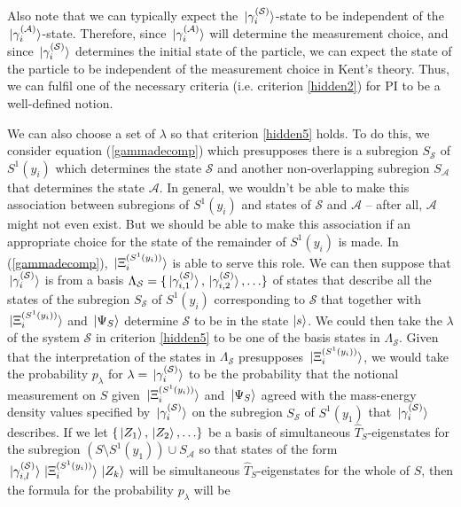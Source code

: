Also note that we can typically expect the $\ket*{\gamma_i^{(\mathcal{S})}}$-state to be independent of the $\ket*{\gamma_i^{(\mathcal{A})}}$-state. Therefore, since $\ket*{\gamma_i^{(\mathcal{A})}}$ will determine the measurement choice, and since $\ket*{\gamma_i^{(\mathcal{S})}}$ determines the initial state of the particle, we can expect the state of the particle to be independent of the measurement choice in Kent's theory. Thus, we can fulfil one of the necessary criteria (i.e. criterion \ref{hidden2}) for PI to be a well-defined notion.

We can also choose a set of $\lambda$ so that criterion \ref{hidden5} holds. To do this, we consider equation (\ref{gammadecomp}) which presupposes there is a subregion $S_{\mathcal{S}}$ of $S^1(y_i)$ which determines the state $\mathcal{S}$ and another non-overlapping subregion $S_{\mathcal{A}}$ that determines the state $\mathcal{A}$. In general, we wouldn't be able to make this association between subregions of $S^1(y_i)$ and states of  $\mathcal{S}$  and $\mathcal{A}$ -- after all, $\mathcal{A}$ might not even exist. But we should be able to make this association if an appropriate choice for the state of the remainder of $S^1(y_i)$ is made. In (\ref{gammadecomp}), $\ket*{\Xi_i^{(S^1(y_i))}}$ is able to serve this role. We can then suppose that $\ket*{\gamma_i^{(\mathcal{S})}}$ is from a basis $\Lambda_{\mathcal{S}}=\{\ket*{\gamma_{i,1}^{(\mathcal{S})}},\ket*{\gamma_{i,2}^{(\mathcal{S})}},\ldots\}$ of states that describe all the states of the subregion $S_{\mathcal{S}}$ of $S^1(y_i)$ corresponding to $\mathcal{S}$ that together with $\ket*{\Xi_i^{(S^1(y_i))}}$ and $\ket*{\Psi_S}$ determine $\mathcal{S}$ to be in the state $\ket{s}$. We could then take the $\lambda$ of the system $\mathcal{S}$ in criterion \ref{hidden5} to be one of the basis states in $\Lambda_{\mathcal{S}}$. Given that the interpretation of the states in $\Lambda_{\mathcal{S}}$ presupposes $\ket*{\Xi_i^{(S^1(y_i))}}$, we would take the probability $p_\lambda$ for $\lambda = \ket*{\gamma_i^{(\mathcal{S})}}$ to be the probability that the notional measurement on $S$ given $\ket*{\Xi_i^{(S^1(y_i))}}$ and $\ket*{\Psi_S}$ agreed with the mass-energy density values specified by $ \ket*{\gamma_i^{(\mathcal{S})}}$ on the subregion $S_{\mathcal{S}}$ of $S^1(y_1)$ that $ \ket*{\gamma_i^{(\mathcal{S})}}$ describes. If we let $\{\ket*{Z_1}, \ket*{Z_2},\ldots  \}$ be a basis of simultaneous $\hat{T}_S$-eigenstates for the subregion $(S\setminus S^1(y_1))\cup S_{\mathcal{A}}$ so that states of the form $\ket*{\gamma_{i,l}^{(\mathcal{S})}}\ket*{\Xi_i^{(S^1(y_i))}}\ket*{Z_k}$ will be simultaneous $\hat{T}_S$-eigenstates for the whole of $S$, then the formula for the probability $p_\lambda$ will be 
